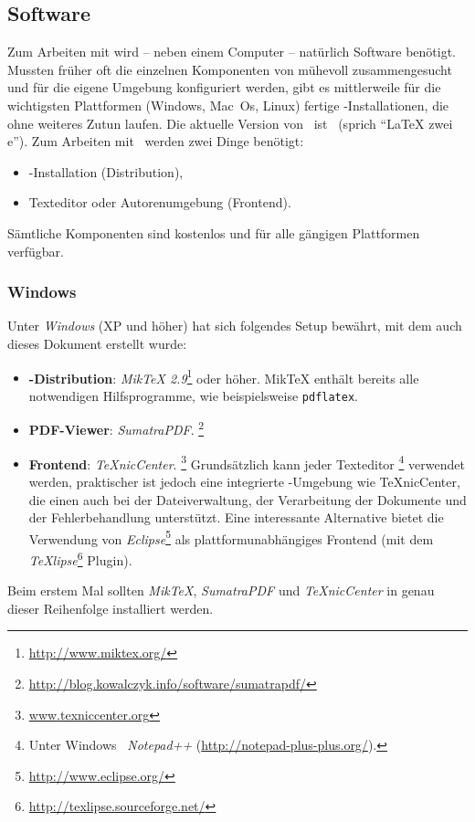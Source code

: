 \subsection{Software}
\label{sec:Software}

Zum Arbeiten mit \latex wird -- neben einem Computer -- natürlich Software benötigt. Mussten früher oft die einzelnen Komponenten von \latex mühevoll zusammengesucht und für die eigene Umgebung konfiguriert werden, gibt es mittlerweile für die wichtigsten Plattformen (Windows, Mac~Os, Linux) fertige \latex-Installationen, die ohne weiteres Zutun laufen. Die aktuelle Version von \latex\ ist \LaTeXe\ (sprich "`LaTeX zwei e"'). 
Zum Arbeiten mit \latex\ werden zwei Dinge benötigt:
%
\begin{itemize}
\item \latex-Installation (Distribution),
\item Texteditor oder Autorenumgebung (Frontend).
\end{itemize}
%
Sämtliche Komponenten sind kostenlos und für alle gängigen Plattformen verfügbar.


\subsubsection{Windows}
\label{sec:Windows}

Unter \emph{Windows} (XP und höher) hat sich folgendes Setup bewährt,
mit dem \ua auch dieses Dokument erstellt wurde:
%
\begin{itemize}
\item \textbf{\latex-Distribution}: \emph{MikTeX 2.9}\footnote{\url{http://www.miktex.org/}} oder höher.
MikTeX enthält bereits alle notwendigen Hilfsprogramme, wie beispielsweise \texttt{pdflatex}.

\item \textbf{PDF-Viewer}: \emph{SumatraPDF}.%
\footnote{\url{http://blog.kowalczyk.info/software/sumatrapdf/}}

\item \textbf{Frontend}: \emph{TeXnicCenter}.%
\footnote{\url{www.texniccenter.org}}
Grundsätzlich kann jeder Texteditor%
\footnote{Unter Windows \zB\ \emph{Notepad++} (\url{http://notepad-plus-plus.org/}).}
verwendet werden, praktischer ist jedoch eine integrierte \latex-Um\-geb\-ung wie TeXnicCenter, die einen auch bei 
der Dateiverwaltung, der Verarbeitung der Dokumente und der Fehlerbehandlung unterstützt.
Eine interessante Alternative bietet die Verwendung von \emph{Eclipse}\footnote{\url{http://www.eclipse.org/}}
als plattformunabhängiges Frontend 
(mit dem \emph{TeXlipse}\footnote{\url{http://texlipse.sourceforge.net/}} Plugin).
\end{itemize}
%
Beim erstem Mal sollten \emph{MikTeX}, \emph{SumatraPDF} und \emph{TeXnicCenter} in genau dieser Reihenfolge installiert werden.

